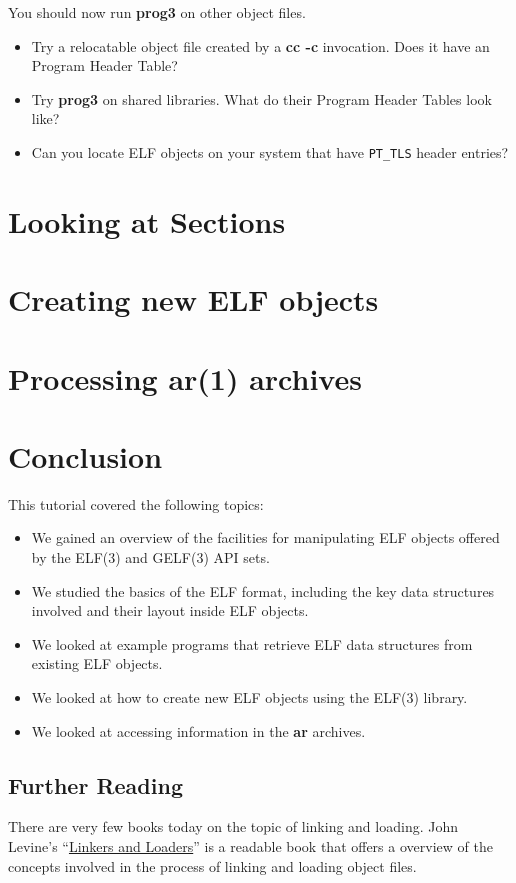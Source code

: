 \documentclass[a4paper]{report}
\newcommand{\constant}[1]{\texttt{#1}}
\newcommand{\tool}[1]{\textbf{#1}}
\begin{document}
You should now run \tool{prog3} on other object files.

\begin{itemize}
\item Try a relocatable object file created by a \tool{cc -c}
  invocation.  Does it have an Program Header Table?
\item Try \tool{prog3} on shared libraries.  What do their Program
  Header Tables look like?
\item Can you locate ELF objects on your system that have
  \constant{PT\_TLS} header entries?
\end{itemize}

\chapter{Looking at Sections}\label{chap.elf-sections}
\chapter{Creating new ELF objects}\label{chap.creating-elf}
\chapter{Processing ar(1) archives}\label{chap.ar}

\chapter{Conclusion}\label{chap.conclusion}
This tutorial covered the following topics:
\begin{itemize}
\item We gained an overview of the facilities for manipulating ELF
  objects offered by the ELF(3) and GELF(3) API sets.
\item We studied the basics of the ELF format, including the key data
  structures involved and their layout inside ELF objects.
\item We looked at example programs that retrieve ELF data structures
  from existing ELF objects.
\item We looked at how to create new ELF objects using the ELF(3)
  library.
\item We looked at accessing information in the \tool{ar} archives.
\end{itemize}

\section{Further Reading}
There are very few books today on the topic of linking and loading.
John Levine's ``\href{http://linker.iecc.com/}{Linkers and Loaders}''
is a readable book that offers a overview of the concepts involved in
the process of linking and loading object files.
\end{document}
